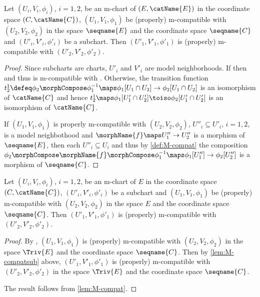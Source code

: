 \documentclass{article}
\begin{document}
\begin{lemma}
\label{lem:M-compatsub}
Let $(U_i, V_i, \phi_i)$, $i=1,2$, be an m-chart of $(E, \catName{E})$
in the coordinate space $(C,\catName{C})$,
\nobreaks
  {{
    $(U_1, V_1, \phi_1)$
  }}
be (properly) m-compatible with
\nobreaks
  {{
    $(U_2, V_2, \phi_2)$
  }}
in the space $\seqname{E}$ and the coordinate space $\seqname{C}$ and
\nobreaks
  {{
    $(U'_i, V'_i, \phi'_i)$
  }}
be a subchart. Then
\nobreaks
  {{
    $(U'_1, V'_1, \phi'_1)$
  }}
is (properly) m-compatible with
\nobreaks
  {{
    $(U'_2, V'_2, \phi'_2)$.
  }}

\begin{proof}
Since subcharts are charts, $U'_i$ and $V'_i$ are model neighborhoods.
If  then
 and thus
 is m-compatible with
.  Otherwise, the transition
function
\nobreaks
  {{
    $
      t^1_2 \defeq
      \phi_2 \morphCompose \phi^{-1}_1
      \maps \phi_1[U_1 \cap U_2] \to \phi_2[U_1 \cap U_2]
    $
  }}
is an isomorphism of $\catName{C}$ and hence
\nobreaks
  {{
    $
      t^1_2 \maps \phi_1[U'_1 \cap U'_2] \toiso \phi_2[U'_1 \cap U'_2]
    $
 }}
is an isomorphism of $\catName{C}$.

If $(U_1, V_1, \phi_1)$ is properly m-compatible with
$(U_2, V_2, \phi_2)$,
$U''_i \subseteq U'_i$, $i=1,2$, is a model neighbothood and
$\morphName{f} \maps U''_1 \to U''_2$ is a morphism of $\seqname{E}$,
then each $U''_i \subseteq U_i$ and thus by \cref{def:M-compat} the
composition
$
  \phi_2 \morphCompose \morphName{f} \morphCompose \phi^{-1}_1
  \maps \phi_1[U''_1] \to \phi_2[U''_2]
$
is a morphism of $\seqname{C}$.
\end{proof}

Let $(U_i, V_i, \phi_i)$, $i=1,2$, be an m-chart of $E$ in the
coordinate space $(C,\catName{C})$, $(U'_i, V'_i, \phi'_i)$ be a
subchart and $(U_1, V_1, \phi_1)$ be (properly) m-compatible with
\nobreaks
  {{
    $(U_2, V_2, \phi_2)$
  }}
in the space $E$ and the coordinate space $\seqname{C}$. Then
\nobreaks
  {{
    $(U'_1, V'_1, \phi'_1)$
  }}
is (properly) m-compatible with
\nobreaks
  {{
    $(U'_2, V'_2, \phi'_2)$.
  }}

\begin{proof}
By , $(U_1, V_1, \phi_1)$ is (properly)
m-compatible with $(U_2, V_2, \phi_2)$ in the space $\Triv{E}$ and the
coordinate space $\seqname{C}$. Then by \cref{lem:M-compatsub} above,
$(U'_1,V'_1,\phi'_1)$ is (properly) m-compatible with
$(U'_2,V'_2,\phi'_2)$ in the space $\Triv{E}$ and the coordinate space
$\seqname{C}$.

The result follows from \cref{lem:M-compat}.
\end{proof}
\end{lemma}
\end{document}
